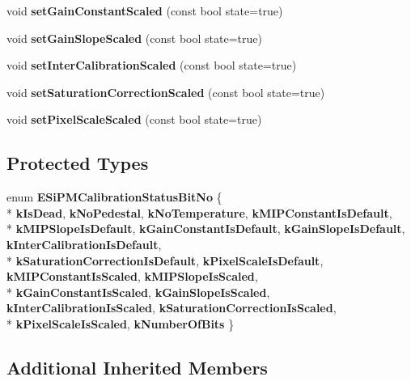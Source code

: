 \begin{DoxyCompactItemize}
\item 
void {\bfseries set\-Gain\-Constant\-Scaled} (const bool state=true)\label{classCALICE_1_1SiPMCalibrationStatusBits_ab3c28fa5fb81ad45eec71a1679d97ef1}

\item 
void {\bfseries set\-Gain\-Slope\-Scaled} (const bool state=true)\label{classCALICE_1_1SiPMCalibrationStatusBits_a10088c8f481ba4f08cb9a6028af80263}

\item 
void {\bfseries set\-Inter\-Calibration\-Scaled} (const bool state=true)\label{classCALICE_1_1SiPMCalibrationStatusBits_a21bdee55388a7fdc76cd10167d017649}

\item 
void {\bfseries set\-Saturation\-Correction\-Scaled} (const bool state=true)\label{classCALICE_1_1SiPMCalibrationStatusBits_a10c7bf85262f71b771a11a31795355b9}

\item 
void {\bfseries set\-Pixel\-Scale\-Scaled} (const bool state=true)\label{classCALICE_1_1SiPMCalibrationStatusBits_a65b0ac5ea727b7c58c939934b8b68c9f}

\end{DoxyCompactItemize}
\subsection*{Protected Types}
\begin{DoxyCompactItemize}
\item 
enum {\bf E\-Si\-P\-M\-Calibration\-Status\-Bit\-No} \{ \\*
{\bf k\-Is\-Dead}, 
{\bf k\-No\-Pedestal}, 
{\bf k\-No\-Temperature}, 
{\bf k\-M\-I\-P\-Constant\-Is\-Default}, 
\\*
{\bf k\-M\-I\-P\-Slope\-Is\-Default}, 
{\bf k\-Gain\-Constant\-Is\-Default}, 
{\bf k\-Gain\-Slope\-Is\-Default}, 
{\bf k\-Inter\-Calibration\-Is\-Default}, 
\\*
{\bf k\-Saturation\-Correction\-Is\-Default}, 
{\bf k\-Pixel\-Scale\-Is\-Default}, 
{\bf k\-M\-I\-P\-Constant\-Is\-Scaled}, 
{\bf k\-M\-I\-P\-Slope\-Is\-Scaled}, 
\\*
{\bf k\-Gain\-Constant\-Is\-Scaled}, 
{\bf k\-Gain\-Slope\-Is\-Scaled}, 
{\bf k\-Inter\-Calibration\-Is\-Scaled}, 
{\bf k\-Saturation\-Correction\-Is\-Scaled}, 
\\*
{\bf k\-Pixel\-Scale\-Is\-Scaled}, 
{\bfseries k\-Number\-Of\-Bits}
 \}
\end{DoxyCompactItemize}
\subsection*{Additional Inherited Members}


